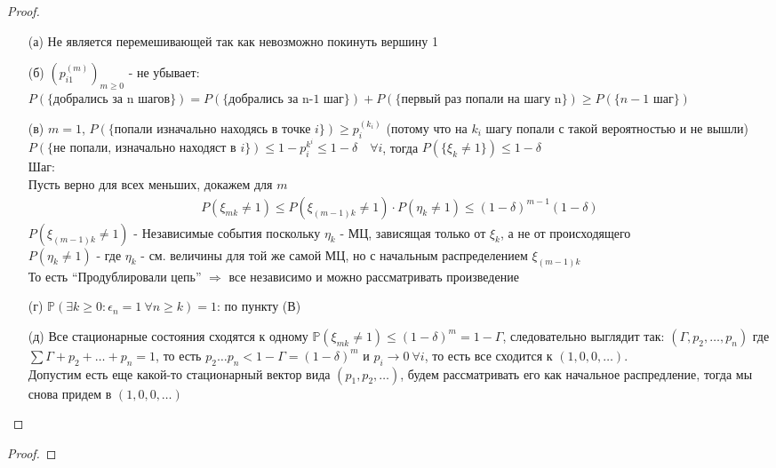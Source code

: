     \begin{proof}
    \begin{itemize}
    \item[(а)] Не является перемешивающей так как невозможно покинуть вершину 1
    \item[(б)] $\left(p_{i 1}^{(m)}\right)_{m \geq 0}$ - не убывает: $P(\text{\{добрались за n шагов\}}) = P(\text{\{добрались за n-1 шаг\}}) + P(\text{\{первый раз попали на шагу n\}}) \geq P(\{n-1 \text{ шаг}\})$
    \item[(в)] $m = 1$, $P(\{\text{попали изначально находясь в точке } i\}) \geq p_{i}^{(k_i)}$ (потому что на $k_i$ шагу попали с такой вероятностью и не вышли)\\
    $P(\{\text{не попали, изначально находяст в } i\}) \leq 1 - p_{i}^{k^{i}} \leq 1 - \delta\quad \forall i$, тогда $P(\{\xi_{k} \ne 1\}) \leq 1 - \delta$\\
    Шаг:\\
    Пусть верно для всех меньших, докажем для $m$
    \begin{gather*}
        P(\xi_{mk} \ne 1)
        \leq P(\xi_{(m-1)k} \ne 1) \cdot P(\eta_{k} \ne 1)
        \leq (1 - \delta)^{m-1} (1 - \delta)
    \end{gather*}
    $P(\xi_{(m-1)k} \ne 1)$ - Независимые события поскольку $\eta_{k}$ - МЦ, зависящая только от $\xi_{k}$, а не от происходящего\\
    $P(\eta_{k} \ne 1)$ - где $\eta_{k}$ - см. величины для той же самой МЦ, но с начальным распределением $\xi_{(m-1)k}$\\
    То есть ``Продублировали цепь'' $\Rightarrow$ все независимо и можно рассматривать произведение
    \item[(г)] $\mathbb{P}(\exists k \geq 0: \epsilon_{n} = 1\ \forall n \geq k) = 1$: по пункту (В)
    \item[(д)] Все стационарные состояния сходятся к одному $\mathbb{P}(\xi_{mk} \ne 1) \leq (1 - \delta)^{m} = 1 - \Gamma$, следовательно выглядит так: $(\Gamma, p_2, \ldots, p_n)$ где $\sum \Gamma + p_2 + \ldots + p_n = 1$, то есть $p_2 \ldots p_n < 1 - \Gamma = (1 - \delta)^m$ и $p_i \to 0\ \forall i$, то есть все сходится к $(1,0,0, \ldots)$.\\
    Допустим есть еще какой-то стационарный вектор вида $(p_1, p_2, \ldots)$, будем рассматривать его как начальное распредление, тогда мы снова придем в $(1, 0, 0, \ldots)$
    \end{itemize}
    \end{proof}
\vskip 0.6in


 
    \begin{prob}
    \end{prob}
    \begin{proof}
    \end{proof}
\vskip 0.6in


